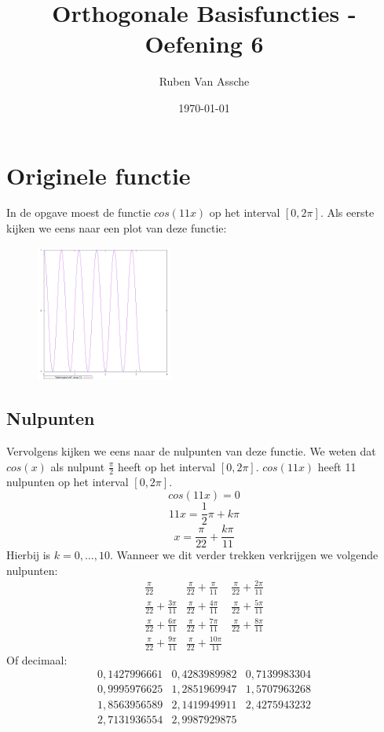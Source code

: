 \documentclass[10pt,a4paper,twocolumn]{article}
\author{Ruben Van Assche}
\title{Orthogonale Basisfuncties - Oefening 6}
\date{\today}
\begin{document}
\maketitle
\section{Originele functie}
In de opgave moest de functie $cos(11x)$ op het interval $[0,2 \pi]$. Als eerste kijken we eens naar een plot van deze functie:
\begin{figure}[H]
\includegraphics[width=0.4\textwidth]{original-3}
\end{figure}
\subsection{Nulpunten}
Vervolgens kijken we eens naar de nulpunten van deze functie. We weten dat $cos(x)$ als nulpunt $\frac{\pi}{2}$ heeft op het interval  $[0,2 \pi]$. $cos(11x)$ heeft 11 nulpunten op het interval $[0,2 \pi]$. 
$$cos(11x) = 0$$
$$11x = \frac{1}{2} \pi + k \pi$$
$$x = \frac{\pi}{22} +\frac{k \pi}{11}$$
Hierbij is $k = 0,\hdots,10$. Wanneer we dit verder trekken verkrijgen we volgende nulpunten:
$$
\begin{matrix}
\frac{\pi}{22}  &  \frac{\pi}{22} +\frac{\pi}{11} & \frac{\pi}{22} +\frac{2 \pi}{11} \\ 
\frac{\pi}{22} +\frac{3 \pi}{11} & \frac{\pi}{22} +\frac{4 \pi}{11} &  \frac{\pi}{22} +\frac{5 \pi}{11}\\ 
\frac{\pi}{22} +\frac{6 \pi}{11} & \frac{\pi}{22} +\frac{7 \pi}{11}  & \frac{\pi}{22} +\frac{8 \pi}{11} \\
\frac{\pi}{22} +\frac{9 \pi}{11} & \frac{\pi}{22} +\frac{10 \pi}{11} &
\end{matrix}
$$
Of decimaal:
$$
\begin{matrix}
0,1427996661 &  0,4283989982 & 0,7139983304 \\
0,9995976625 & 1,2851969947 & 1,5707963268 \\
1,8563956589 & 2,1419949911 & 2,4275943232 \\
2,7131936554 & 2,9987929875& 
\end{matrix}
$$
\end{document}
